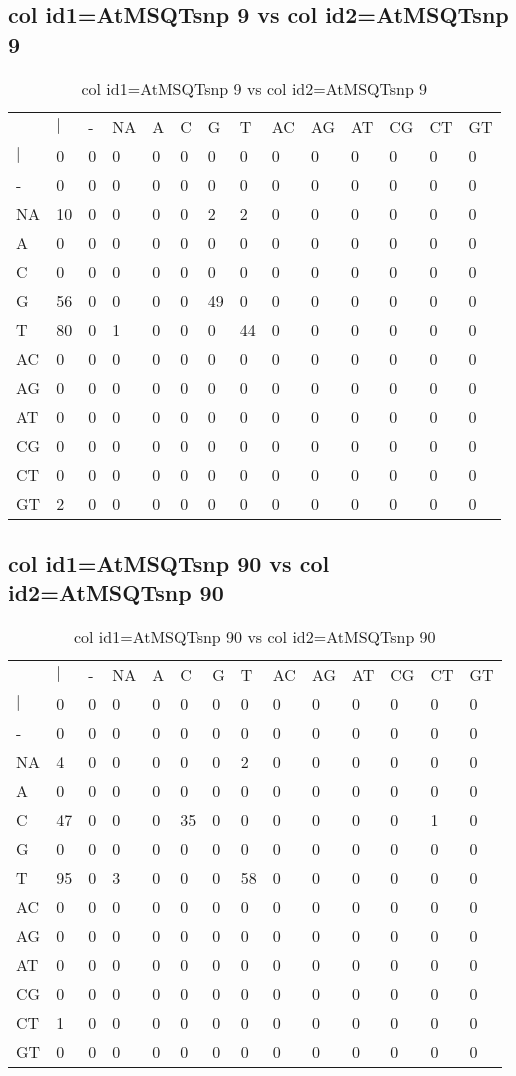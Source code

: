 \subsection{col id1=AtMSQTsnp 9 vs col id2=AtMSQTsnp 9}
\begin{center}
\begin{longtable}{|l|l|l|l|l|l|l|l|l|l|l|l|l|l|}
\caption{col id1=AtMSQTsnp 9 vs col id2=AtMSQTsnp 9} \label{table_dm782}\\
\hline
\\
\hline
&$|$&-&NA&A&C&G&T&AC&AG&AT&CG&CT&GT\\
$|$&0&0&0&0&0&0&0&0&0&0&0&0&0\\
-&0&0&0&0&0&0&0&0&0&0&0&0&0\\
NA&10&0&0&0&0&2&2&0&0&0&0&0&0\\
A&0&0&0&0&0&0&0&0&0&0&0&0&0\\
C&0&0&0&0&0&0&0&0&0&0&0&0&0\\
G&56&0&0&0&0&49&0&0&0&0&0&0&0\\
T&80&0&1&0&0&0&44&0&0&0&0&0&0\\
AC&0&0&0&0&0&0&0&0&0&0&0&0&0\\
AG&0&0&0&0&0&0&0&0&0&0&0&0&0\\
AT&0&0&0&0&0&0&0&0&0&0&0&0&0\\
CG&0&0&0&0&0&0&0&0&0&0&0&0&0\\
CT&0&0&0&0&0&0&0&0&0&0&0&0&0\\
GT&2&0&0&0&0&0&0&0&0&0&0&0&0\\
\hline
\end{longtable}
\end{center}

\subsection{col id1=AtMSQTsnp 90 vs col id2=AtMSQTsnp 90}
\begin{center}
\begin{longtable}{|l|l|l|l|l|l|l|l|l|l|l|l|l|l|}
\caption{col id1=AtMSQTsnp 90 vs col id2=AtMSQTsnp 90} \label{table_dm784}\\
\hline
\\
\hline
&$|$&-&NA&A&C&G&T&AC&AG&AT&CG&CT&GT\\
$|$&0&0&0&0&0&0&0&0&0&0&0&0&0\\
-&0&0&0&0&0&0&0&0&0&0&0&0&0\\
NA&4&0&0&0&0&0&2&0&0&0&0&0&0\\
A&0&0&0&0&0&0&0&0&0&0&0&0&0\\
C&47&0&0&0&35&0&0&0&0&0&0&1&0\\
G&0&0&0&0&0&0&0&0&0&0&0&0&0\\
T&95&0&3&0&0&0&58&0&0&0&0&0&0\\
AC&0&0&0&0&0&0&0&0&0&0&0&0&0\\
AG&0&0&0&0&0&0&0&0&0&0&0&0&0\\
AT&0&0&0&0&0&0&0&0&0&0&0&0&0\\
CG&0&0&0&0&0&0&0&0&0&0&0&0&0\\
CT&1&0&0&0&0&0&0&0&0&0&0&0&0\\
GT&0&0&0&0&0&0&0&0&0&0&0&0&0\\
\hline
\end{longtable}
\end{center}

